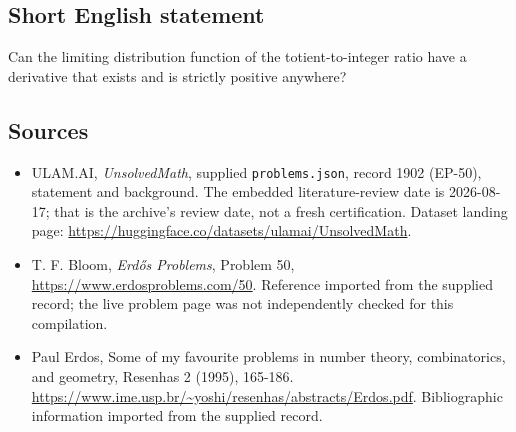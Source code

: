 \documentclass[11pt,a4paper]{article}
\begin{document}
\subsection{Short English statement}

Can the limiting distribution function of the totient-to-integer ratio have a derivative that exists and is strictly positive anywhere?

\subsection{Sources}

{\small

\begin{itemize}

\item[\hypertarget{source:1902:1}{S1}] ULAM.AI, \emph{UnsolvedMath}, supplied \texttt{problems.json}, record 1902 (EP-50), statement and background. The embedded literature-review date is 2026-08-17; that is the archive’s review date, not a fresh certification. Dataset landing page: \url{https://huggingface.co/datasets/ulamai/UnsolvedMath}.

\item[\hypertarget{source:1902:2}{S2}] T. F. Bloom, \emph{Erdős Problems}, Problem 50, \url{https://www.erdosproblems.com/50}. Reference imported from the supplied record; the live problem page was not independently checked for this compilation.

\item[\hypertarget{source:1902:3}{S3}] Paul Erdos, Some of my favourite problems in number theory, combinatorics, and geometry, Resenhas 2 (1995), 165-186. \url{https://www.ime.usp.br/~yoshi/resenhas/abstracts/Erdos.pdf}. Bibliographic information imported from the supplied record.

\end{itemize}

}

\label{end:1902}
\end{document}

